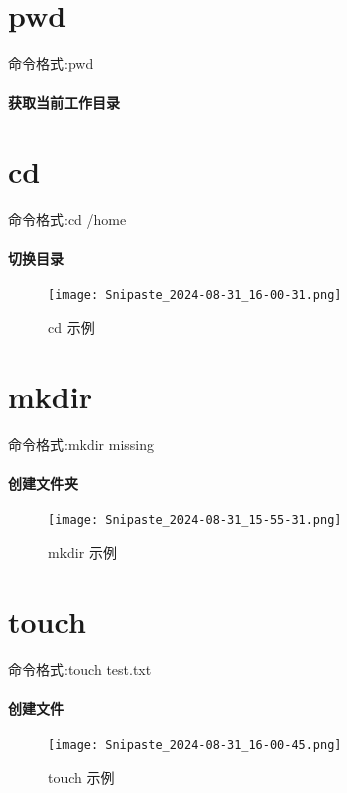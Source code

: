 \documentclass[a4paper, 12pt]{article}
\begin{document}
	\title{\color{red}{\huge 实验报告}}
	\author{\color{blue}{\large 周雍凡}}
	\date{\today}
	\maketitle
	
	\tableofcontents
	\newpage
	
	\setcounter{page}{1}
	
	\section{pwd}
	{\color{blue} 命令格式:pwd}
	\paragraph{获取当前工作目录}
        
	\section{cd}
	{\color{blue} 命令格式:cd /home}
	\paragraph{切换目录}
    \begin{figure}[h]
        \centering
        \texttt{[image: Snipaste\_2024-08-31\_16-00-31.png]}
        \caption{cd 示例}
        \label{fig:cd示例}
    \end{figure}
	
	\section{mkdir}
	{\color{blue} 命令格式:mkdir missing}
	\paragraph{创建文件夹}
    \begin{figure}[h]
        \centering
        \texttt{[image: Snipaste\_2024-08-31\_15-55-31.png]}
        \caption{mkdir 示例}
        \label{fig:mkdir示例}
    \end{figure}
	
	\section{touch}
	{\color{blue} 命令格式:touch test.txt}
	\paragraph{创建文件}
    \begin{figure}[h]
        \centering
        \texttt{[image: Snipaste\_2024-08-31\_16-00-45.png]}
        \caption{touch 示例}
        \label{fig:touch示例}
    \end{figure}
\end{document}
